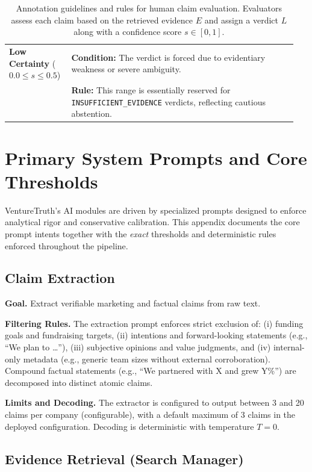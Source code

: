 \begin{table}[t]
\begin{tabular}{@{}p{0.2\linewidth} p{0.75\linewidth}@{}}
\textbf{Low Certainty} \newline ($0.0 \le s \le 0.5$) & 
\textbf{Condition:} The verdict is forced due to evidentiary weakness or severe ambiguity. \\
& \textbf{Rule:} This range is essentially reserved for \texttt{INSUFFICIENT\_EVIDENCE} verdicts, reflecting cautious abstention. \\
\end{tabular}
\caption{Annotation guidelines and rules for human claim evaluation. Evaluators assess each claim based on the retrieved evidence $E$ and assign a verdict $L$ along with a confidence score $s \in [0,1]$.}
\label{tab:annotation_rules}
\end{table}

\section{Primary System Prompts and Core Thresholds}
\label{app:prompts_thresholds}

VentureTruth's AI modules are driven by specialized prompts designed to enforce analytical rigor and conservative calibration. This appendix documents the core prompt intents together with the \emph{exact} thresholds and deterministic rules enforced throughout the pipeline.

\subsection{Claim Extraction}
\label{app:claim_extraction}

\textbf{Goal.} Extract verifiable marketing and factual claims from raw text.

\textbf{Filtering Rules.} The extraction prompt enforces strict exclusion of:
(i) funding goals and fundraising targets,
(ii) intentions and forward-looking statements (e.g., ``We plan to \dots''),
(iii) subjective opinions and value judgments, and
(iv) internal-only metadata (e.g., generic team sizes without external corroboration).
Compound factual statements (e.g., ``We partnered with X and grew Y\%'') are decomposed into distinct atomic claims.

\textbf{Limits and Decoding.} The extractor is configured to output between 3 and 20 claims per company (configurable), with a default maximum of 3 claims in the deployed configuration. Decoding is deterministic with temperature $T=0$.

\subsection{Evidence Retrieval (Search Manager)}
\label{app:evidence_retrieval}

